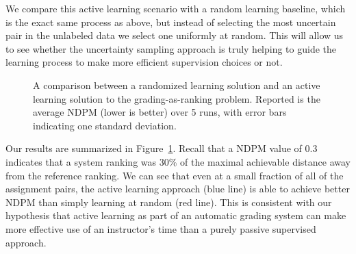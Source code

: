 We compare this active learning scenario with a random learning baseline,
which is the exact same process as above, but instead of selecting the most
uncertain pair in the unlabeled data we select one uniformly at random.
This will allow us to see whether the uncertainty sampling approach is
truly helping to guide the learning process to make more efficient
supervision choices or not.

\begin{figure}
  \begin{center}
  \caption{A comparison between a randomized learning solution and an
  active learning solution to the grading-as-ranking problem. Reported is
  the average NDPM (lower is better) over 5 runs, with error bars indicating
  one standard deviation.}
  \label{fig:active-learning}
\vskip-10pt
  \end{center}
\end{figure}

Our results are summarized in Figure~\ref{fig:active-learning}. Recall that
a NDPM value of $0.3$ indicates that a system ranking was 30\% of the
maximal achievable distance away from the reference ranking. We can see
that even at a small fraction of all of the assignment pairs, the active
learning approach (blue line) is able to achieve better NDPM than simply
learning at random (red line). This is consistent with our hypothesis that
active learning as part of an automatic grading system can make more
effective use of an instructor's time than a purely passive supervised
approach.

